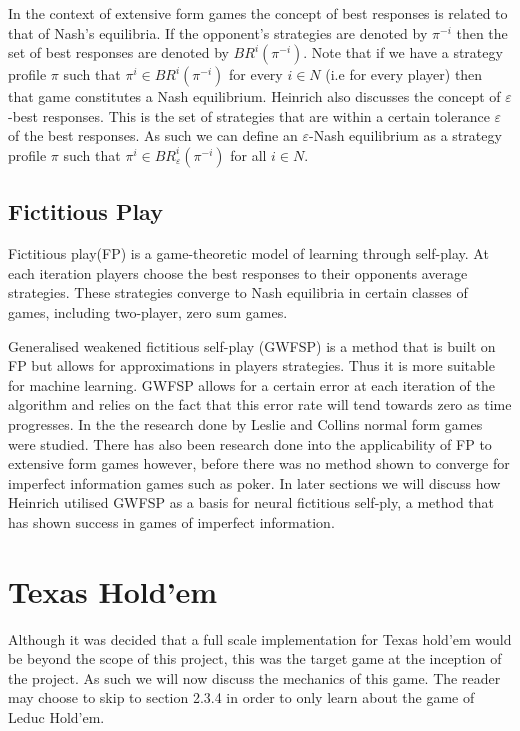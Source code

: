 In the context of extensive form games the concept of best responses is related to that of Nash's equilibria.
If the opponent's strategies are denoted by $\pi^{-i}$ then the set of best responses are denoted by
$BR^i(\pi^{-i})$.
Note that if we have a strategy profile $\pi$ such that $\pi^i\in BR^i(\pi^{-i})$ for every $i\in N$ (i.e
for every player) then that game constitutes a Nash equilibrium\citep{heinrich2017reinforcement}.
Heinrich also discusses the concept of $\varepsilon$-best responses.
This is the set of strategies that are within a certain tolerance $\varepsilon$ of the best responses.
As such we can define an $\varepsilon$-Nash equilibrium as a strategy profile $\pi$ such that
$\pi^i \in BR^i_\varepsilon (\pi^{-i})$ for all $i\in N$.

\subsection{Fictitious Play}\label{subsec:fictitiousPlay}
Fictitious play(FP) is a game-theoretic model of learning through self-play.
At each iteration players choose the best responses to their opponents average
strategies\citep{heinrich2017reinforcement}.
These strategies converge to Nash equilibria in certain classes of games, including two-player, zero sum games.

Generalised weakened fictitious self-play (GWFSP) is a method that is built on FP but allows for approximations
in players strategies\citep{leslie2006generalised}.
Thus it is more suitable for machine learning.
GWFSP allows for a certain error at each iteration of the algorithm and relies on the fact that this
error rate will tend towards zero as time progresses.
In the the research done by Leslie and Collins normal form games were studied.
There has also been research done into the applicability of FP to extensive form games however,
before\citep{heinrich2016deep} there was no method shown to converge for imperfect information games such as poker.
In later sections we will discuss how Heinrich utilised GWFSP as a basis for neural fictitious self-ply,
a method that has shown success in games of imperfect information.

\section{Texas Hold'em}\label{sec:thIntro}
Although it was decided that a full scale implementation for Texas hold'em would be beyond the
scope of this project, this was the target game at the inception of the project.
As such we will now discuss the mechanics of this game.
The reader may choose to skip to section 2.3.4 in order to only learn about the game of Leduc Hold'em.

